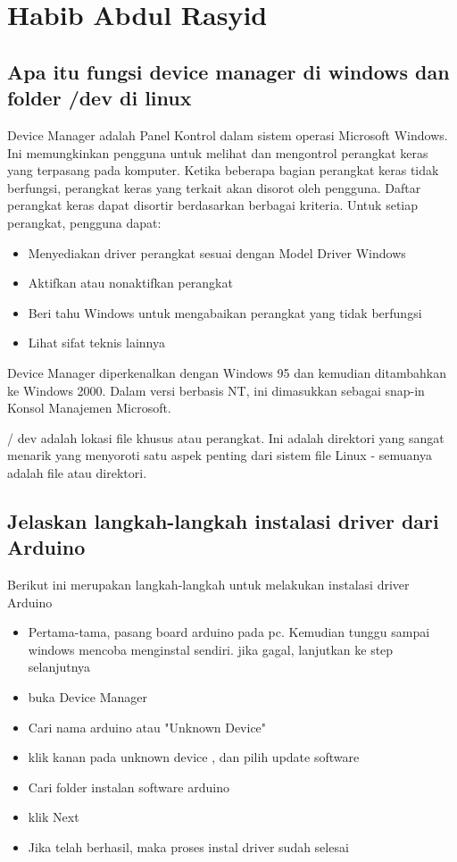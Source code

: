 \section{Habib Abdul Rasyid}
\subsection{ Apa itu fungsi device manager di windows dan folder /dev di linux}
Device Manager adalah Panel Kontrol dalam sistem operasi Microsoft Windows. Ini memungkinkan pengguna untuk melihat dan mengontrol perangkat keras yang terpasang pada komputer. Ketika beberapa bagian perangkat keras tidak berfungsi, perangkat keras yang terkait akan disorot oleh pengguna. Daftar perangkat keras dapat disortir berdasarkan berbagai kriteria.
Untuk setiap perangkat, pengguna dapat:
\begin{itemize}
     \item Menyediakan driver perangkat sesuai dengan Model Driver Windows
     \item Aktifkan atau nonaktifkan perangkat
     \item Beri tahu Windows untuk mengabaikan perangkat yang tidak berfungsi
     \item Lihat sifat teknis lainnya
\end{itemize}
Device Manager diperkenalkan dengan Windows 95 dan kemudian ditambahkan ke Windows 2000. Dalam versi berbasis NT, ini dimasukkan sebagai snap-in Konsol Manajemen Microsoft.\newline

/ dev adalah lokasi file khusus atau perangkat. Ini adalah direktori yang sangat menarik yang menyoroti satu aspek penting dari sistem file Linux - semuanya adalah file atau direktori.


\subsection{Jelaskan langkah-langkah instalasi driver dari Arduino}
Berikut ini merupakan langkah-langkah untuk melakukan instalasi driver Arduino
\begin{itemize}
	\item Pertama-tama, pasang board arduino pada pc. Kemudian tunggu sampai windows mencoba menginstal sendiri. jika gagal, lanjutkan ke step selanjutnya
	\item buka Device Manager 
	\item Cari nama arduino atau "Unknown Device"
	\item klik kanan pada unknown device , dan pilih update software
	\item Cari folder instalan software arduino
	\item klik Next
	\item Jika telah berhasil, maka proses instal driver sudah selesai
\end{itemize}

